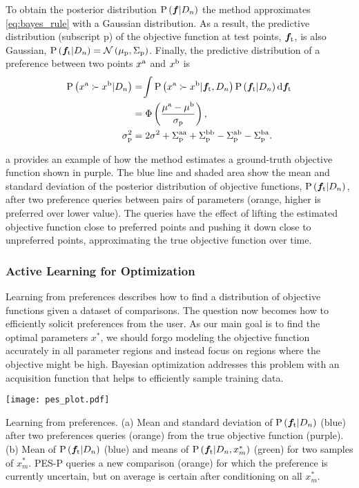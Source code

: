 To obtain the posterior distribution $\prob{\vecf{f}|D_n}$ the method
approximates \cref{eq:bayes_rule} with a Gaussian distribution. As a result, the
predictive distribution (subscript p) of the objective function at test points,
$\vecf{f}[\tn{t}]$, is also Gaussian, $\prob{\vecf{f}[\tn{t}] | D_n} =
\mathcal{N} \left( \mu_\tn{p}, \Sigma_\tn{p} \right)$. Finally, the predictive
distribution of a preference between two points $x^{\mathrm{a}}$ and $x^{\mathrm{b}}$ is 
\begin{align} 
    \prob{x^\tn{a} \succ x^\tn{b} |D_n} 
    &=\hspace{-2pt}\int \prob{x^\tn{a} \succ x^\tn{b}|\vecf{f}[\tn{t}],D_n}
    \prob{\vecf{f}[\tn{t}]| D_n} \tn{d} \vecf{f}[\tn{t}] 
        \label{eq:prob_of_pref}\\
    &= \Phi \left(\frac{\mu^\tn{a} - \mu^\tn{b}}{\sigma_\tn{p}} \right),
        \label{eq:p_pref} \\ 
    \sigma_\tn{p}^2 &= 2\sigma^2 + \Sigma_\tn{p}^\tn{aa} + \Sigma_\tn{p}^\tn{bb}
        - \Sigma_\tn{p}^\tn{ab} - \Sigma_\tn{p}^\tn{ba}.
\end{align}

a provides an example of how the method estimates a
ground-truth objective function shown in purple. The blue line and shaded area show
the mean and standard deviation of the posterior distribution of objective
functions, $\prob{\vecf{f}_\tn{t}|D_n}$, after two preference queries between
pairs of parameters (orange, higher is preferred over lower value). The queries
have the effect of lifting the estimated objective function close to preferred
points and pushing it down close to unpreferred points, approximating the true
objective function over time.

\subsubsection{Active Learning for Optimization}
Learning from preferences describes how to find a distribution of objective
functions given a dataset of comparisons. The question now becomes how to
efficiently solicit preferences from the user. As our main goal is to find the
optimal parameters $x^*$, we should forgo modeling the objective function
accurately in all parameter regions and instead focus on regions where the
objective might be high. Bayesian optimization addresses this problem with an
acquisition function that helps to efficiently sample training data.
\begin{marginfigure}
    \centering
    \texttt{[image: pes\_plot.pdf]}
    \caption{Learning from preferences. (a) Mean and standard deviation of
    $\prob{\vecf{f}[\tn{t}]|D_n}$ (blue) after two preferences queries (orange)
    from the true objective function (purple). (b) Mean of
    $\prob{\vecf{f}[\tn{t}]|D_n}$ (blue) and means of
    $\prob{\vecf{f}[\tn{t}]|D_n, x_m^*}$ (green) for two samples of $x_m^*$.
    PES-P queries a new comparison (orange) for which the preference is
    currently uncertain, but on average is certain after conditioning on all
    $x_m^*$.}\label{fig:pes_plot}
\end{marginfigure}

